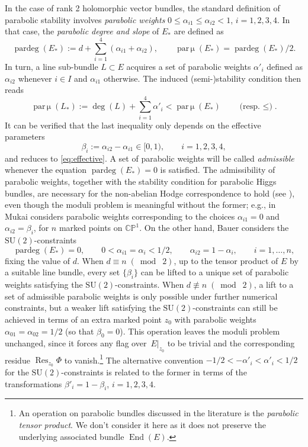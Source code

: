 \documentclass[pdftex]{sigma}
\newcommand{\field}[1]{\ensuremath{\mathbb{#1}}}
\newcommand{\CC}{\field{C}}
\newcommand{\PP}{\field{P}}
\DeclareMathOperator{\End}{End}
\DeclareMathOperator{\pardeg}{\mathrm{par}\deg}
\DeclareMathOperator{\parmu}{\mathrm{par}\,\mu}
\DeclareMathOperator{\Res}{Res}
\numberwithin{equation}{section}
\begin{document}
\begin{Remark}\label{rem:effective}
In the case of rank 2 holomorphic vector bundles, the standard definition of parabolic stability \cite{MS80,Sim90} involves \emph{parabolic weights} $0\leq \alpha_{i1}\leq\alpha_{i2}<1$, $i=1,2,3,4$. In that case, the \emph{parabolic degree and slope} of $E_{*}$ are defined as
\[
\pardeg(E_{*}) := d + \sum_{i = 1}^{4}(\alpha_{i1}+ \alpha_{i2}),\qquad
\parmu (E_{*}) = \pardeg(E_{*})/2.
\]
In turn, a line sub-bundle $L\subset E$ acquires a set of parabolic weights $\alpha'_{i}$ defined as $\alpha_{i2}$ whenever $i\in I$ and $\alpha_{i1}$ otherwise. The induced (semi-)stability condition then reads
\[
\parmu (L_{*}):=\deg(L)+\sum_{i=1}^{4}\alpha'_{i} < \parmu(E_{*}) \qquad \text{(resp.~$\leq$)}.
\]
It can be verified that the last inequality only depends on the effective parameters
\[
\beta_{i} :=\alpha_{i2}-\alpha_{i1}\in[0,1),\qquad i=1,2,3,4,
\]
and reduces to \eqref{eq:effective}. A set of parabolic weights will be called \emph{admissible} whenever the equation $\pardeg(E_{*})=0$ is satisfied. The admissibility of parabolic weights, together with the stability condition for parabolic Higgs bundles, are necessary for the non-abelian Hodge correspondence to hold (see \cite{Sim90}), even though the moduli problem is meaningful without the former; e.g., in~\cite{Muk03} Mukai considers parabolic weights corresponding to the choices $\alpha_{i1}=0$ and $\alpha_{i2}=\beta_{i}$, for $n$ marked points on $\CC\PP^{1}$. On the other hand, Bauer \cite{Bau91} considers the $\mathrm{SU}(2)$-constraints
\[
\pardeg(E_{*})=0,\qquad 0<\alpha_{i1}=\alpha_{i}< 1/2,\qquad \alpha_{i2} = 1-\alpha_{i},\qquad i=1,\dots,n,
\]
fixing the value of $d$. When $d \equiv n\; (\bmod\; 2)$, up to the tensor product of $E$ by a suitable line bundle, every set $\{\beta_{i}\}$ can be lifted to a unique set of parabolic weights satisfying the $\mathrm{SU}(2)$-constraints. When $d \not\equiv n\; (\bmod\; 2)$, a lift to a set of admissible parabolic weights is only possible under further numerical constraints, but a weaker lift satisfying the $\mathrm{SU}(2)$-constraints can still be achieved in terms of an extra marked point $z_{0}$ with parabolic weights $\alpha_{01}=\alpha_{02}=1/2$ (so that $\beta_{0}=0$). This operation leaves the moduli problem unchanged, since it forces any flag over~$E|_{z_{0}}$ to be trivial and the corresponding residue $\Res_{z_{0}}\Phi$ to vanish.\footnote{An operation on parabolic bundles discussed in the literature is the \emph{parabolic tensor product}. We don't consider it here as it does not preserve the underlying associated bundle $\End (E)$.}
The alternative convention $-1/2<-\alpha'_{i}< \alpha'_{i}< 1/2$ for the $\mathrm{SU}(2)$-constraints is related to the former in terms of the transformations $\beta'_{i}= 1-\beta_{i}$, $i=1,2,3,4$.
\end{Remark}
\end{document}
